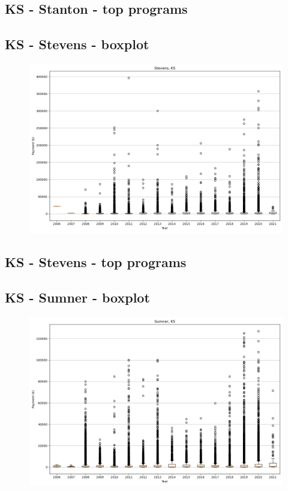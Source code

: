 \subsection*{KS - Stanton - top programs}

\newpage
\subsection*{KS - Stevens - boxplot}
\begin{figure}[h]
\centering
\includegraphics[width=7in]{../output/boxplots/counties/Stevens-KS_boxplot.png}
\end{figure}


\subsection*{KS - Stevens - top programs}

\newpage
\subsection*{KS - Sumner - boxplot}
\begin{figure}[h]
\centering
\includegraphics[width=7in]{../output/boxplots/counties/Sumner-KS_boxplot.png}
\end{figure}


